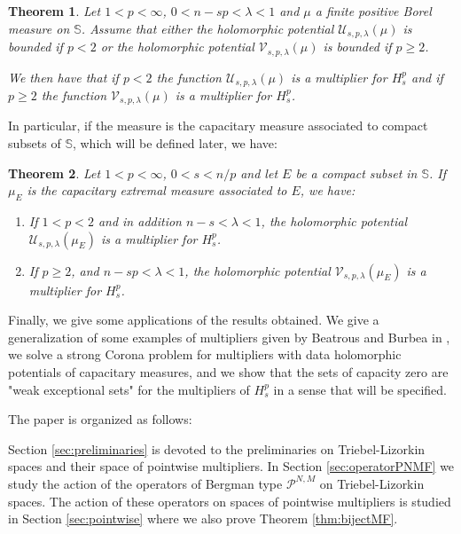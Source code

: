 \documentclass[12pt,twoside,leqno,final]{amsart}
\theoremstyle{plain}
\newtheorem{thm}{Theorem}[section]
\begin{document}
 \begin{thm}\label{thm:multpot}
Let $1<p<\infty$, $0<n-sp< \lambda<1$ and $\mu$ a finite positive Borel measure on ${{\mathbb S}}$. Assume that either
the holomorphic potential ${\mathcal U}_{s,p,\lambda}(\mu)$ is bounded if $p< 2$ or
 the holomorphic potential ${\mathcal V}_{s,p,\lambda}(\mu)$ is bounded if $p\geq 2$. 

We then have that if $p< 2$ the function ${\mathcal U}_{s,p,\lambda}(\mu)$ is a multiplier for $H_s^p$ and if $p\geq 2$ the function ${\mathcal V}_{s,p,\lambda}(\mu)$ is a multiplier for $H_s^p$.
\end{thm}
In particular, if the measure is the capacitary measure associated to compact subsets of ${{\mathbb S}}$, which will be defined later, we have:

\begin{thm}\label{thm:multsextremal}
Let $1<p<\infty$, $0<s<n/p$  and let $E$ be a compact subset in ${{\mathbb S}}$.   If $\mu_E$ is the capacitary extremal measure associated to $E$, we  have:
\begin{enumerate}
\item If $1<p<2$ and in addition $n-s<\lambda<1 $, the holomorphic potential ${\mathcal U}_{s,p,\lambda}(\mu_E)$ is a multiplier for $H_s^p$.
\item  If $p\geq 2$, and $n-sp<\lambda<1$, the holomorphic potential ${\mathcal V}_{s,p,\lambda}(\mu_E)$ is a multiplier for $H_s^p$.
\end{enumerate}
\end{thm}
 
Finally, we give some applications of the results obtained. We give a generalization of some examples of multipliers given by Beatrous and Burbea in \cite{beatrousburbea}, we solve a strong Corona problem for multipliers with data holomorphic potentials of capacitary measures, and we show that the sets of capacity zero are "weak exceptional sets" for the multipliers of $H_s^p$ in a sense that will be specified.

The paper is organized as follows:

 Section \ref{sec:preliminaries} is devoted to the preliminaries on Triebel-Lizorkin spaces and their space of pointwise multipliers. 
 In Section \ref{sec:operatorPNMF}  we study the action of the operators of Bergman type ${{\mathcal P}}^{N,M}$ on Triebel-Lizorkin spaces. 
 The action of these operators on spaces of pointwise multipliers is studied in Section  \ref{sec:pointwise} where we also prove Theorem \ref{thm:bijectMF}. 
 
\end{document}
